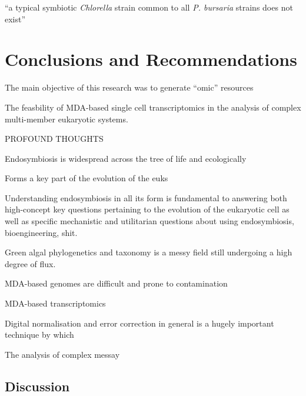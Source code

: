 \graphicspath{{chapters/7.Discussion/figures}}

\begin{savequote}[75mm]
    ``a typical symbiotic \textit{Chlorella} strain common to all \textit{P. bursaria}
    strains does not exist''
\end{savequote}

\chapter{Conclusions and Recommendations}

The main objective of this research was to generate ``omic'' resources


The feasbility of MDA-based single cell transcriptomics in the analysis
of complex multi-member eukaryotic systems.








PROFOUND THOUGHTS

Endosymbiosis 
is widespread across the tree of life and
ecologically

Forms a key part of the evolution of the euks


Understanding endosymbiosis in all its form is
fundamental to answering both high-concept key questions 
pertaining to the evolution
of the eukaryotic cell as well as specific mechanistic
and utilitarian questions about using
endosymbiosis, bioengineering, shit.


Green algal phylogenetics and taxonomy is a messy field still 
undergoing a high degree of flux. 

MDA-based genomes are difficult and prone to contamination 

MDA-based transcriptomics 


Digital normalisation and error correction in general is a hugely
important technique by which 




The analysis of complex messay 


\section{Discussion}


\section{}

